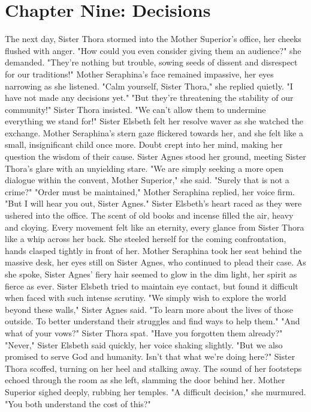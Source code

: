 \documentclass[11pt]{article}
\begin{document}
\section{Chapter Nine: Decisions}
\label{sec:orgfa63262}
The next day, Sister Thora stormed into the Mother Superior's office, her cheeks flushed with anger. "How could you even consider giving them an audience?" she demanded. "They're nothing but trouble, sowing seeds of dissent and disrespect for our traditions!"
Mother Seraphina's face remained impassive, her eyes narrowing as she listened. "Calm yourself, Sister Thora," she replied quietly. "I have not made any decisions yet."
"But they're threatening the stability of our community!" Sister Thora insisted. "We can't allow them to undermine everything we stand for!"
Sister Elsbeth felt her resolve waver as she watched the exchange. Mother Seraphina's stern gaze flickered towards her, and she felt like a small, insignificant child once more. Doubt crept into her mind, making her question the wisdom of their cause.
Sister Agnes stood her ground, meeting Sister Thora's glare with an unyielding stare. "We are simply seeking a more open dialogue within the convent, Mother Superior," she said. "Surely that is not a crime?"
"Order must be maintained," Mother Seraphina replied, her voice firm. "But I will hear you out, Sister Agnes."
Sister Elsbeth's heart raced as they were ushered into the office. The scent of old books and incense filled the air, heavy and cloying. Every movement felt like an eternity, every glance from Sister Thora like a whip across her back. She steeled herself for the coming confrontation, hands clasped tightly in front of her.
Mother Seraphina took her seat behind the massive desk, her eyes still on Sister Agnes, who continued to plead their case. As she spoke, Sister Agnes' fiery hair seemed to glow in the dim light, her spirit as fierce as ever. Sister Elsbeth tried to maintain eye contact, but found it difficult when faced with such intense scrutiny.
"We simply wish to explore the world beyond these walls," Sister Agnes said. "To learn more about the lives of those outside. To better understand their struggles and find ways to help them."
"And what of your vows?" Sister Thora spat. "Have you forgotten them already?"
"Never," Sister Elsbeth said quickly, her voice shaking slightly. "But we also promised to serve God and humanity. Isn't that what we're doing here?"
Sister Thora scoffed, turning on her heel and stalking away. The sound of her footsteps echoed through the room as she left, slamming the door behind her.
Mother Superior sighed deeply, rubbing her temples. "A difficult decision," she murmured. "You both understand the cost of this?"
\end{document}

